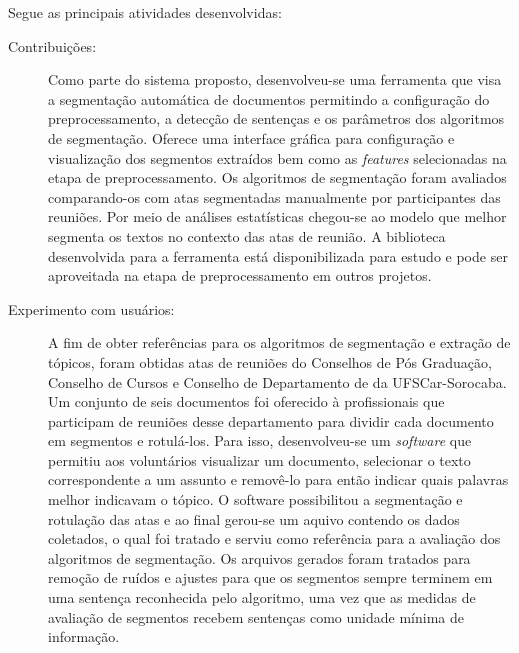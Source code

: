 %

Segue as principais atividades desenvolvidas:

\begin{description}
	
	 
	\item[Contribuições:] Como parte do sistema proposto, desenvolveu-se uma ferramenta que visa a segmentação automática de documentos permitindo a configuração do preprocessamento, a detecção de sentenças e os parâmetros dos algoritmos de segmentação. Oferece uma interface gráfica para configuração e visualização dos segmentos extraídos bem como as \textit{features} selecionadas na etapa de preprocessamento. 
Os algoritmos de segmentação foram avaliados comparando-os com atas segmentadas manualmente por participantes das reuniões. Por meio de análises estatísticas chegou-se ao modelo que melhor segmenta os textos no contexto das atas de reunião. 		
	A biblioteca desenvolvida para a ferramenta está disponibilizada para estudo e pode ser aproveitada na etapa de preprocessamento em outros projetos.

	\item[Experimento com usuários:] A fim de obter referências para os algoritmos de segmentação e  extração de tópicos, foram obtidas atas de reuniões do Conselhos de Pós Graduação, Conselho de Cursos e Conselho de Departamento de da UFSCar-Sorocaba. Um conjunto de seis documentos foi oferecido à profissionais que participam de reuniões desse departamento para dividir cada documento em segmentos e rotulá-los. Para isso, desenvolveu-se um \textit{software} que permitiu aos voluntários visualizar um documento, selecionar o texto correspondente a um assunto e removê-lo para então indicar quais palavras melhor indicavam o tópico. O software possibilitou a segmentação e rotulação das atas e ao final gerou-se um aquivo contendo os dados coletados, o qual foi tratado e serviu como referência para a avaliação dos algoritmos de segmentação.
	Os arquivos gerados foram tratados para remoção de ruídos e ajustes para que os segmentos sempre terminem em uma sentença reconhecida pelo algoritmo, uma vez que as medidas de avaliação de segmentos recebem sentenças como unidade mínima de informação.
	

\end{description}
